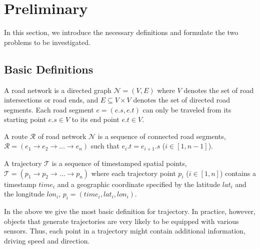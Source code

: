 \section{Preliminary}
\label{sec-preliminary}

In this section, we introduce the necessary definitions %
and formulate the two problems to be investigated.

\subsection{Basic Definitions}
\label{subsec-definition}

\begin{definition}A road network is a directed graph $\mathcal{N}=(V, E)$ where $V$ denotes the set of road intersections or road ends, and $E\subseteq V\times V$ denotes the set of directed road segments.
Each road segment $e=(e.s, e.t)$ can only be traveled from its starting point $e.s\in V$ to its end point $e.t\in V$.
\end{definition}

\begin{definition}[Route]A route $\mathcal{R}$ of road network $\mathcal{N}$ is a sequence of connected road segments, $\mathcal{R} = (e_1 \rightarrow e_2 \rightarrow \dots \rightarrow e_n)$ such that $e_i.t=e_{i+1}.s$ ($i\in[1, n-1]$).
\end{definition}

\begin{definition}[Trajectory]A trajectory $\mathcal{T}$ is a sequence of timestamped spatial points, $\mathcal{T} = (p_1 \rightarrow p_2 \rightarrow \dots \rightarrow p_n)$ where each trajectory point $p_i$ ($i\in[1,n]$) contains a timestamp $time_i$ and a geographic coordinate specified by the latitude $lat_i$ and the longitude $lon_i$, \ie $p_i=(time_i,lat_i,lon_i)$.
\end{definition}

In the above we give the most basic definition for trajectory. In practice, however, objects that generate trajectories are very likely to be equipped with various sensors. Thus, each point in a trajectory might contain additional information, \eg driving speed and direction.



